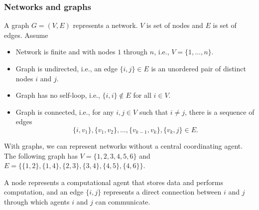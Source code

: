 \documentclass[10pt,mathserif]{beamer}
\begin{document}
\begin{frame}
\frametitle{Networks and graphs}
A graph $G=(V,E)$ represents a network.
$V$ is set of nodes and $E$ is set of edges.
Assume
\begin{itemize}
\item
Network is finite and with nodes $1$ through $n$, i.e., $V=\{1,\dots,n\}$.
\item
Graph is undirected, i.e., an edge $\{i,j\}\in E$ is an unordered pair of distinct nodes $i$ and $j$.
\item
Graph has no self-loop, i.e., $\{i,i\}\notin E$ for all $i\in V$.
\item
Graph is connected, i.e., for any $i,j\in V$ such that $i\ne j$, there is a sequence of edges
\[
\{i,v_1\},\{v_1,v_2\},\dots,\{v_{k-1},v_k\},\{v_k,j\}\in E.
\]
\end{itemize}
\end{frame}




\begin{frame}[plain]
With graphs, we can represent networks without a central coordinating agent. 
The following graph has $V=\{1,2,3,4,5,6\}$ and $E=\{\{1,2\},\{1,4\},\{2,3\},\{3,4\},\{4,5\},\{4,6\}\}$.
\begin{center}
\end{center}

A node represents a computational agent that stores data and performs computation, and an edge $\{i,j\}$ represents a direct connection between $i$ and $j$ through which agents $i$ and $j$ can communicate.
\end{frame}
\end{document}
